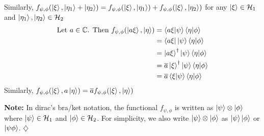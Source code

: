 \documentclass[12pt,twoside,fleqn]{report}
\makeatletter
\theoremstyle{thmstyle}
\renewenvironment{proof}[1][\proofname]{\par
\pushQED{\qed}%
\normalfont \topsep6\p@\@plus6\p@\relax
\trivlist
\item[\hskip\labelsep\itshape#1\@addpunct{.}]\mbox{}\par\nobreak\ignorespaces
}{%
    \popQED\endtrivlist\@endpefalse
    }
\newenvironment{note}{\textbf{Note:}}{\hfill\ensuremath{\diamondsuit}}
\makeatother
\begin{document}
\begin{proof}
    Similarly, $f_{\psi,\phi}(\ket\xi, \ket{\eta_1} + \ket{\eta_2}) = f_{\psi,\phi}(\ket\xi, \ket{\eta_1}) + f_{\psi,\phi}(\ket\xi , \ket{\eta_2})$ 
    for any $\ket\xi \in \mathcal{H}_1$ and $\ket{\eta_1}, \ket{\eta_2}  \in \mathcal{H}_2$
    \begin{align*}
    \text{Let } a \in \mathbb{C}\text{. Then }f_{\psi,\phi}(\ket{a \xi},\ket{\eta}) & = \braket{a \xi|\psi}\braket{\eta|\phi} 
        \\ & = \bra{a \xi}\ket{\psi}\braket{\eta|\phi}
        \\ & = \ket{a \xi}^\dagger \ket{\psi} \braket{\eta|\phi}
        \\ & = \overline{a} \ket{\xi}^\dagger \ket{\psi} \braket{\eta|\phi}
        \\ & = \overline{a} \braket{\xi|\psi} \braket{\eta|\phi}
    \end{align*}
    Similarly, $f_{\psi,\phi}(\ket\xi, a \ket\eta) = \overline{a}f_{\psi,\phi}(\ket\xi, \ket\eta)$
\end{proof}

\begin{note}
    In dirac's bra/ket notation, the functional $f_{\psi,\phi}$ is written as $\ket{\psi} \otimes \ket{\phi}$ where $\ket{\psi} \in \mathcal{H}_1$ and $\ket{\phi} \in \mathcal{H}_2$.
    For simplicity, we also write $\ket{\psi} \otimes \ket{\phi}$ as $\ket{\psi}\ket{\phi}$ or $\ket{\psi\phi}$.
\end{note}
\end{document}
